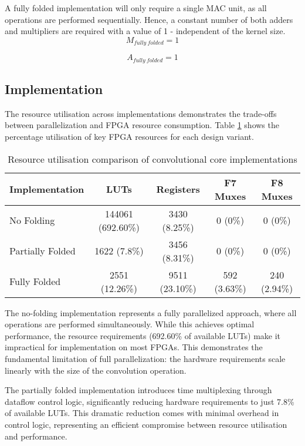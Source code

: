 A fully folded implementation will only require a single MAC unit, as all operations are performed sequentially. Hence, a constant number of both adders and multipliers are required with a value of 1 - independent of the kernel size.
\begin{equation}
    M_{fully\ folded} = 1
\end{equation}

\begin{equation}
    A_{fully\ folded} = 1
\end{equation}

\subsection{Implementation}
The resource utilisation across implementations demonstrates the trade-offs between parallelization and FPGA resource consumption. Table \ref{tab:resource_comparison} shows the percentage utilisation of key FPGA resources for each design variant.

\begin{table}[h!]
    \centering
    \caption{Resource utilisation comparison of convolutional core implementations}
    \label{tab:resource_comparison}
    \begin{tabular}{lcccc}
        \toprule
        Implementation & LUTs & Registers & F7 Muxes & F8 Muxes \\
        \midrule
        No Folding & 144061 (692.60\%) & 3430 (8.25\%) & 0 (0\%) & 0 (0\%) \\
        Partially Folded & 1622 (7.8\%) & 3456 (8.31\%) & 0 (0\%) & 0 (0\%) \\
        Fully Folded & 2551 (12.26\%) & 9511 (23.10\%) & 592 (3.63\%) & 240 (2.94\%) \\
        \bottomrule
    \end{tabular}
\end{table}

The no-folding implementation represents a fully parallelized approach, where all operations are performed simultaneously. While this achieves optimal performance, the resource requirements (692.60\% of available LUTs) make it impractical for implementation on most FPGAs. This demonstrates the fundamental limitation of full parallelization: the hardware requirements scale linearly with the size of the convolution operation.

The partially folded implementation introduces time multiplexing through dataflow control logic, significantly reducing hardware requirements to just 7.8\% of available LUTs. This dramatic reduction comes with minimal overhead in control logic, representing an efficient compromise between resource utilisation and performance.


